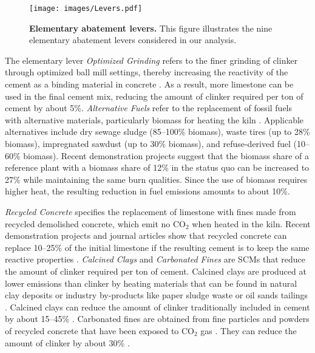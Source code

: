 \documentclass[12pt, a4paper]{article} %
\begin{document}
\begin{figure}[ht]
\centering
\texttt{[image: images/Levers.pdf]}
\caption{\textbf{Elementary abatement levers.} This figure illustrates the nine elementary abatement levers considered in our analysis.}
\label{fig: levers}
\end{figure}

The elementary lever \emph{Optimized Grinding} refers to the finer grinding of clinker through optimized ball mill settings, thereby increasing the reactivity of the cement as a binding material in concrete \citep{ghalandari2020energy,bohm2015energy}. As a result, more limestone can be used in the final cement mix, reducing the amount of clinker required per ton of cement by about 5\%. \emph{Alternative Fuels} refer to the replacement of fossil fuels with alternative materials, particularly biomass for heating the kiln \citep{uson2013uses,rahman2015recent}. Applicable alternatives include dry sewage sludge (85--100\% biomass), waste tires (up to 28\% biomass), impregnated sawdust (up to 30\% biomass), and refuse-derived fuel (10--60\% biomass). Recent demonstration projects suggest that the biomass share of a reference plant with a biomass share of 12\% in the status quo can be increased to 27\% while maintaining the same burn qualities. Since the use of biomass requires higher heat, the resulting reduction in fuel emissions amounts to about 10\%.

\emph{Recycled Concrete} specifies the replacement of limestone with fines made from recycled demolished concrete, which emit no CO$_2$ when heated in the kiln. Recent demonstration projects and journal articles show that recycled concrete can replace 10--25\% of the initial limestone if the resulting cement is to keep the same reactive properties \citep{cantero2020mechanical,cantero2021water}. \emph{Calcined Clays} and \emph{Carbonated Fines} are SCMs that reduce the amount of clinker required per ton of cement. Calcined clays are produced at lower emissions than clinker by heating materials that can be found in natural clay deposits or industry by-products like paper sludge waste or oil sands tailings \citep{gcca2022calcined}. Calcined clays can reduce the amount of clinker traditionally included in cement by about 15--45\% \citep{scrivener2018calcined,sharma2021limestone,hanein2022clay}. Carbonated fines are obtained from fine particles and powders of recycled concrete that have been exposed to CO$_2$ gas \citep{ouyang2020surface}. They can reduce the amount of clinker by about 30\% \citep{zajac2020effect}.
\end{document}
